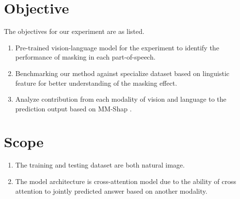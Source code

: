 \section{Objective}
The objectives for our experiment are as listed.
\begin{enumerate}
    \item Pre-trained vision-language model for the experiment to identify the performance of masking in each part-of-speech.
    \item Benchmarking our method against specialize dataset based on linguistic feature \cite{valse} for better understanding of the masking effect.
    \item Analyze contribution from each modality of vision and language to the prediction output based on MM-Shap \cite{mm-shap}.
\end{enumerate}

\section{Scope}
\begin{enumerate}
    \item The training and testing dataset are both natural image.
    \item The model architecture is cross-attention model due to the ability of cross attention to jointly predicted answer based on another modality.
\end{enumerate}


